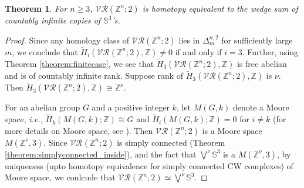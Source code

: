 \documentclass{amsart}
\newtheorem{theorem}{Theorem}[section]
\theoremstyle{definition}
\theoremstyle{remark}
\numberwithin{equation}{section}
\newcommand{\Sp}{\mathbb{S}}
\newcommand{\D}{\Delta}
\newcommand{\vr}[2]{\mathcal{VR}(#1;#2)}
\def\Z{{\mathbb{Z}}}
\newcommand{\sourav}[1]{\textcolor{blue}{#1}}
\begin{document}
\begin{theorem}\label{thm:(Z^n;2)}
	For  $n \geq 3$, $\vr{\Z^n}{2}$ is homotopy equivalent to the wedge sum of countably infinite copies of $\Sp^3$'s.
\end{theorem}

\begin{proof}
	
	Since any homology class of  $\vr{\Z^n}{2}$ lies in $\D_m^{n,2}$  for sufficiently large $m$, we conclude that $\tilde{H}_i(\vr{\Z^n}{2}, \Z) \neq 0$ if and only if $i = 3$. Further, using Theorem \ref{theorem:finitecase}, we see that $\tilde{H}_3(\vr{\Z^n}{2}, \Z)$ is free abelian and is of countably infinite rank. Suppose rank of $\tilde{H}_3(\vr{\Z^n}{2}, \Z)$ is $\nu$. Then $\tilde{H}_3(\vr{\Z^n}{2}, \Z) \cong \Z^{\nu}$.  
	
	
	For an abelian group $G$ and a positive integer $k$, let  $M(G, k)$ denote a Moore  space, {\it i.e., } $\tilde{H}_k(M(G, k);\Z) \cong G$ and $\tilde{H}_i(M(G, k);\Z) =0 $ for $i \neq k$ (for more details on Moore space, see \cite{Hatcher02}).  Then  $\vr{\Z^n}{2}$ is a Moore space  $M(\Z^{\nu}, 3)$. 
	Since $\vr{\Z^n}{2}$ is simply connected (Theorem \ref{theorem:simplyconnected_inside}), and the fact that $\bigvee^{\nu} \Sp^3$ is a $M(\Z^{\nu}, 3)$, by uniqueness (upto homotopy equivalence for simply connected CW complexes) of Moore space, we conlcude that   $\vr{\Z^n}{2}\simeq \bigvee^{\nu} \Sp^3$.
	\end{proof}



	

	


\end{document}
